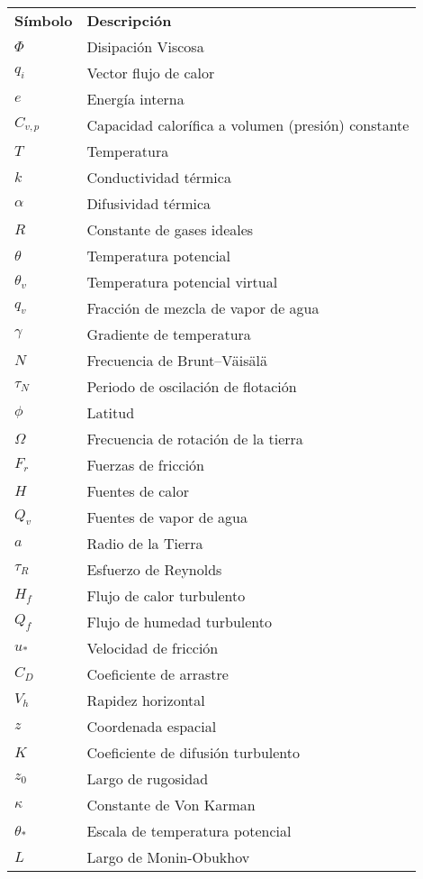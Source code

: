 \begin{tabular}{ll}
	\textbf{Símbolo} & \textbf{Descripción} \\
	$\Phi$ & Disipación Viscosa     \\
	$q_i$ &  Vector flujo de calor   \\ 
	$e$ &  Energía interna   \\
	$C_{v,p}$ &  Capacidad calorífica a volumen (presión) constante   \\ 
	$T$ &   Temperatura  \\
	$k$ &   Conductividad térmica	\\
	$\alpha$ &  Difusividad térmica    \\
	$R$ &   Constante de gases ideales   \\
	$\theta$ &   Temperatura potencial   \\
	$\theta_v$ &   Temperatura potencial virtual   \\
	$q_v$ &   Fracción de mezcla de vapor de agua   \\
	$\gamma$ &    Gradiente de temperatura  \\
	$N$ &  Frecuencia de Brunt–Väisälä    \\
	$\tau_N$ &  Periodo de oscilación de flotación    \\
	$\phi$ & Latitud     \\
	$\Omega$ & Frecuencia de rotación de la tierra     \\
	$F_r$ & Fuerzas de fricción     \\
	$H$ & Fuentes de calor     \\
	$Q_v$ & Fuentes de vapor de agua     \\
	$a$ & Radio de la Tierra     \\
	$\tau_R$ & Esfuerzo de Reynolds  \\
	$H_f$ &   Flujo de calor turbulento   \\
	$Q_f$ &   Flujo de humedad turbulento   \\
	$u_*$ &   Velocidad de fricción   \\
	$C_D$ &   Coeficiente de arrastre  \\
	$V_h$ &   Rapidez horizontal   \\
	$z$ &    Coordenada espacial \\
	$K$ & Coeficiente de difusión turbulento     \\
	$z_0$ &   Largo de rugosidad 	\\
	$\kappa$ &   Constante de Von Karman   \\
	$\theta_*$ &  Escala de temperatura potencial    \\
	$L$ &  Largo de Monin-Obukhov    \\
\end{tabular}
